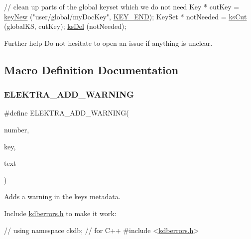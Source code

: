 \begin{DoxyCodeInclude}
        \textcolor{comment}{// clean up parts of the global keyset which we do not need}
        Key * cutKey = \hyperlink{group__key_gad23c65b44bf48d773759e1f9a4d43b89}{keyNew} (\textcolor{stringliteral}{"user/global/myDocKey"}, \hyperlink{group__key_gga9b703ca49f48b482def322b77d3e6bc8aa8adb6fcb92dec58fb19410eacfdd403}{KEY\_END});
        KeySet * notNeeded = \hyperlink{group__keyset_ga6b00cf82b59af4d883a9bad6cf4a4a4a}{ksCut} (globalKS, cutKey);
        \hyperlink{group__keyset_ga27e5c16473b02a422238c8d970db7ac8}{ksDel} (notNeeded);
\end{DoxyCodeInclude}
 \begin{DoxyParagraph}{Further help}
Do not hesitate to open an issue if anything is unclear. 
\end{DoxyParagraph}


\subsection{Macro Definition Documentation}
\mbox{\label{group__plugin_ga3da3bdb0f41710adda9eee3d7adac9ff}} 
\subsubsection{\texorpdfstring{E\+L\+E\+K\+T\+R\+A\+\_\+\+A\+D\+D\+\_\+\+W\+A\+R\+N\+I\+NG}{ELEKTRA\_ADD\_WARNING}}
{\footnotesize\ttfamily \#define E\+L\+E\+K\+T\+R\+A\+\_\+\+A\+D\+D\+\_\+\+W\+A\+R\+N\+I\+NG(\begin{DoxyParamCaption}\item[{}]{number,  }\item[{}]{key,  }\item[{}]{text }\end{DoxyParamCaption})}



Adds a warning in the keys metadata. 

Include \hyperlink{kdberrors_8h}{kdberrors.\+h} to make it work\+:


\begin{DoxyCodeInclude}
\textcolor{comment}{// using namespace ckdb; // for C++}
\textcolor{preprocessor}{#include <\hyperlink{kdberrors_8h}{kdberrors.h}>}
\end{DoxyCodeInclude}



